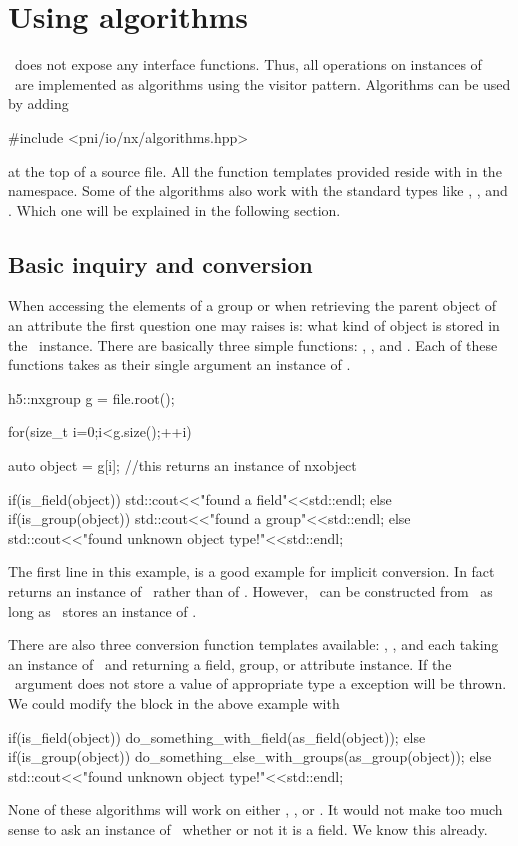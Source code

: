 \section{Using algorithms}\label{section:algorithms}

\nxobject\ does not expose any interface functions. Thus, all operations on 
instances of \nxobject\ are implemented as algorithms using the visitor pattern. 
Algorithms can be used by adding 
\begin{cppcode}
#include <pni/io/nx/algorithms.hpp>
\end{cppcode}
at the top of a source file. All the function templates provided 
reside with in the  namespace. 
Some of the algorithms also work with the standard types like \nxfield,
\nxgroup, and \nxattribute. Which one will be explained in the following
section.

\subsection{Basic inquiry and conversion}

When accessing the elements of a group or when retrieving the parent object of
an attribute the first question one may raises is: what kind of object is stored
in the \nxobject\ instance. 
There are basically three simple functions: ,
, and . Each of these functions takes as their
single argument an instance of \nxobject. 
\begin{cppcode}
h5::nxgroup g = file.root();

for(size_t i=0;i<g.size();++i)
{
    auto object = g[i]; //this returns an instance of nxobject 

    if(is_field(object))
        std::cout<<"found a field"<<std::endl;
    else if(is_group(object))
        std::cout<<"found a group"<<std::endl;
    else
        std::cout<<"found unknown object type!"<<std::endl;
}
\end{cppcode}
The first line in this example,  is a 
good example for implicit conversion. In fact  returns an instance
of \nxobject\ rather than of \nxgroup. However, \nxgroup\ can be constructed 
from \nxobject\ as long as \nxobject\ stores an instance of \nxgroup.

There are also three conversion function templates available: , 
, and  each taking an instance of 
\nxobject\ and returning a field, group, or attribute instance. If the 
\nxobject\ argument does not store a value of appropriate type a
 exception will be thrown. 
We could modify the  block in the above example with 
\begin{cppcode}
if(is_field(object))
    do_something_with_field(as_field(object));
else if(is_group(object))
    do_something_else_with_groups(as_group(object));
else
    std::cout<<"found unknown object type!"<<std::endl;
\end{cppcode}
None of these algorithms will work on either \nxfield, \nxgroup, or
\nxattribute. It would not make too much sense to ask an instance of \nxfield\
whether or not it is a field. We know this already. 

